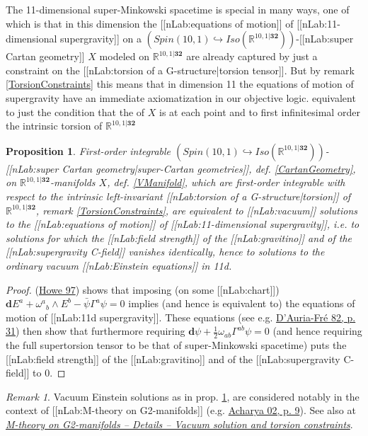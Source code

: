 \documentclass[12pt,titlepage]{article}
\theoremstyle{plain}
\newtheorem{prop}{Proposition}
\theoremstyle{definition}
\theoremstyle{remark}
\newtheorem{remark}{Remark}
\begin{document}
The 11-dimensional super-Minkowski spacetime is special in many ways, one of which is that in this dimension the [[nLab:equations of motion]] of [[nLab:11-dimensional supergravity]] on a $(Spin(10,1)\hookrightarrow Iso(\mathbb{R}^{10,1\vert \mathbf{32}}))$-[[nLab:super Cartan geometry]] $X$ modeled on $\mathbb{R}^{10,1\vert \mathbf{32}}$ are already captured by just a constraint on the [[nLab:torsion of a G-structure|torsion tensor]]. But by remark \ref{TorsionConstraints} this means that in dimension 11 the equations of motion of supergravity have an immediate axiomatization in our objective logic.
equivalent to just the condition that the of $X$ is at each point and to first infinitesimal order the intrinsic torsion of $\mathbb{R}^{10,1\vert \mathbf{32}}$
\begin{prop}
\label{VacuumSolutionsIn11d}\hypertarget{VacuumSolutionsIn11d}{}
First-order integrable $(Spin(10,1)\hookrightarrow Iso(\mathbb{R}^{10,1\vert \mathbf{32}}))$-[[nLab:super Cartan geometry|super-Cartan geometries]], def. \ref{CartanGeometry}, on $\mathbb{R}^{10,1\vert\mathbf{32}}$-manifolds $X$, def. \ref{VManifold}, which are first-order integrable with respect to the intrinsic left-invariant [[nLab:torsion of a G-structure|torsion]] of $\mathbb{R}^{10,1\vert \mathbf{32}}$, remark \ref{TorsionConstraints}, are equivalent to [[nLab:vacuum]] solutions to the [[nLab:equations of motion]] of [[nLab:11-dimensional supergravity]], i.e. to solutions for which the [[nLab:field strength]] of the [[nLab:gravitino]] and of the [[nLab:supergravity C-field]] vanishes identically, hence to solutions to the ordinary vacuum [[nLab:Einstein equations]] in 11d.
\end{prop}
\begin{proof}
(\href{http://ncatlab.org/nlab/show/torsion+constraints+in+supergravity#Howe97}{Howe 97}) shows that imposing (on some [[nLab:chart]]) $\mathbf{d} E^a + \omega^{a}{}_b \wedge E^b - \bar \psi \Gamma^a \psi  = 0$ implies (and hence is equivalent to) the equations of motion of [[nLab:11d supergravity]]. These equations (see e.g. \href{http://ncatlab.org/nlab/show/11-dimensional%20supergravity#DAuriaFre}{D'Auria-Fré 82, p. 31}) then show that furthermore requiring $\mathbf{d} \psi + \tfrac{1}{2}\omega_{a b} \Gamma^{a b}\psi = 0$ (and hence requiring the full supertorsion tensor to be that of super-Minkowski spacetime) puts the [[nLab:field strength]] of the [[nLab:gravitino]] and of the [[nLab:supergravity C-field]] to 0.
\end{proof}
\begin{remark}
\label{}\hypertarget{}{}
Vacuum Einstein solutions as in prop. \ref{VacuumSolutionsIn11d}, are considered notably in the context of [[nLab:M-theory on G2-manifolds]] (e.g. \href{http://ncatlab.org/nlab/show/M-theory+on+G2-manifolds#Acharya02}{Acharya 02, p. 9}). See also at \emph{\href{http://ncatlab.org/nlab/show/M-theory+on+G2-manifolds#VacuumSolutionsAndTorsion}{M-theory on G2-manifolds -- Details -- Vacuum solution and torsion constraints}}.
\end{remark}
\end{document}
